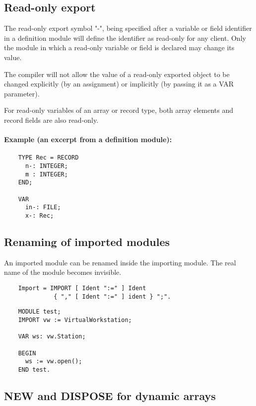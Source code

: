 \subsection{Read-only export}\label{RO:export}

\mextonly

The \ot{} read-only export symbol "-", being specified after a variable or field
identifier in a definition module will define the identifier as read-only
for any client.
Only the module in which a read-only variable or field is declared may
change its value.

The compiler will not allow the value
of a read-only exported object to be changed explicitly (by
an assignment) or implicitly (by passing it as a VAR parameter).

For read-only variables of an array or record type, both array elements
and record fields are also read-only.

\paragraph{Example (an excerpt from a definition module):}
\begin{verbatim}
    TYPE Rec = RECORD
      n-: INTEGER;
      m : INTEGER;
    END;

    VAR
      in-: FILE;
      x-: Rec;
\end{verbatim}

\subsection{Renaming of imported modules}
\mextonly

An imported module can be renamed inside the importing module. The real
name of the module becomes invisible.
\begin{verbatim}
    Import = IMPORT [ Ident ":=" ] Ident
              { "," [ Ident ":=" ] ident } ";".
\end{verbatim}

\Example
\begin{verbatim}
    MODULE test;
    IMPORT vw := VirtualWorkstation;

    VAR ws: vw.Station;

    BEGIN
      ws := vw.open();
    END test.
\end{verbatim}

\subsection{NEW and DISPOSE for dynamic arrays}\label{m2:ext:NEW}

